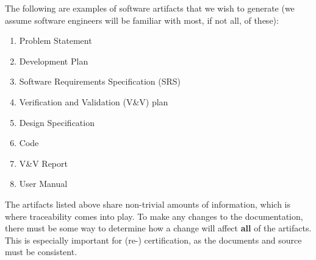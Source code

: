 \documentclass{sig-alternate-05-2015}
\begin{document}
The following are examples of software artifacts
that we wish to generate (we assume software engineers will be familiar with
most, if not all, of these):

\begin{enumerate}
\item Problem Statement
\item Development Plan
\item Software Requirements Specification (SRS)
\item Verification and Validation (V\&V) plan
\item Design Specification
\item Code
\item V\&V Report 
\item User Manual
\end{enumerate}

The artifacts listed above share non-trivial amounts of information, which is
where traceability comes into play. To make any changes to the documentation,
there must be some way to determine how a change will affect \textbf{all} of the
artifacts. This is especially important for (re-) certification, as the
documents and source must be consistent.
\end{document}
